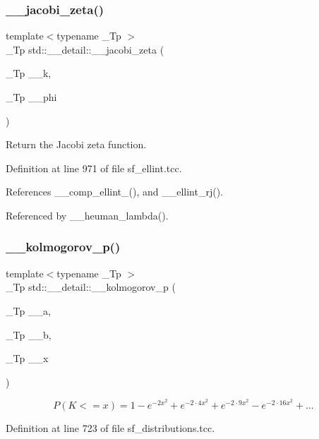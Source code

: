 \subsubsection{\texorpdfstring{\+\_\+\+\_\+jacobi\+\_\+zeta()}{\_\_jacobi\_zeta()}}
{\footnotesize\ttfamily template$<$typename \+\_\+\+Tp $>$ \\
\+\_\+\+Tp std\+::\+\_\+\+\_\+detail\+::\+\_\+\+\_\+jacobi\+\_\+zeta (\begin{DoxyParamCaption}\item[{\+\_\+\+Tp}]{\+\_\+\+\_\+k,  }\item[{\+\_\+\+Tp}]{\+\_\+\+\_\+phi }\end{DoxyParamCaption})}

Return the Jacobi zeta function. 

Definition at line 971 of file sf\+\_\+ellint.\+tcc.



References \+\_\+\+\_\+comp\+\_\+ellint\+\_(), and \+\_\+\+\_\+ellint\+\_\+rj().



Referenced by \+\_\+\+\_\+heuman\+\_\+lambda().

\mbox{\label{namespacestd_1_1____detail_a826af8d14ad1914733d751cbb4561957}} 
\subsubsection{\texorpdfstring{\+\_\+\+\_\+kolmogorov\+\_\+p()}{\_\_kolmogorov\_p()}}
{\footnotesize\ttfamily template$<$typename \+\_\+\+Tp $>$ \\
\+\_\+\+Tp std\+::\+\_\+\+\_\+detail\+::\+\_\+\+\_\+kolmogorov\+\_\+p (\begin{DoxyParamCaption}\item[{\+\_\+\+Tp}]{\+\_\+\+\_\+a,  }\item[{\+\_\+\+Tp}]{\+\_\+\+\_\+b,  }\item[{\+\_\+\+Tp}]{\+\_\+\+\_\+x }\end{DoxyParamCaption})}

\[ P(K <= x) = 1 - e^{-2x^2} + e^{-2 \cdot 4 x^2} + e^{-2 \cdot 9 x^2} - e^{-2 \cdot 16 x^2} + ... \] 

Definition at line 723 of file sf\+\_\+distributions.\+tcc.

